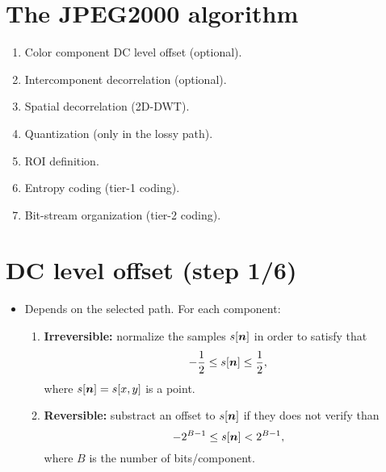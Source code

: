 \begin{comment}
\section{>Qu'e es la codificaci'on progresiva?}
\begin{itemize}
\item Debido a la gran cantidad de datos que se generan, la
  transmisi'on de las im'agenes, incluso en un formato comprimido,
  necesitan un cierto tiempo. Cuando es posible reconstruir la imagen
  en el receptor con un sub-conjunto del stream de datos comprimidos,
  hablaremos de codificaci'on progresiva de im'agenes.
  \vspace{-1ex}
  \begin{center}
    \svg{rate-distortion}{600}
  \end{center}
\end{itemize}
\end{comment}

\section{The JPEG2000 algorithm}
\begin{center}
\end{center}
\begin{enumerate}
\item Color component DC level offset (optional).
\item Intercomponent decorrelation (optional).
\item Spatial decorrelation (2D-DWT).
\item Quantization (only in the lossy path).
\item ROI definition.
\item Entropy coding (tier-1 coding).
\item Bit-stream organization (tier-2 coding).
\end{enumerate}

\section{DC level offset (step 1/6)}
\begin{itemize}
\item [] Depends on the selected path. For each component:
\begin{enumerate}
\item \textbf{Irreversible:} normalize the samples
  $s[{\mbox{\boldmath$n$}}]$ in order to satisfy that
  \begin{equation}
    -\frac{1}{2}\le s[{\mbox{\boldmath$n$}}] \le \frac{1}{2},
  \end{equation}
  where $s[{\mbox{\boldmath$n$}}]=s[x,y]$ is a point.
\item \textbf{Reversible:} substract an offset to 
  $s[{\mbox{\boldmath$n$}}]$ if they does not verify than
  \begin{equation}
    -2^{B-1}\le s[{\mbox{\boldmath$n$}}] < 2^{B-1},
  \end{equation}
  where $B$ is the number of bits/component.
\end{enumerate}
\end{itemize}

